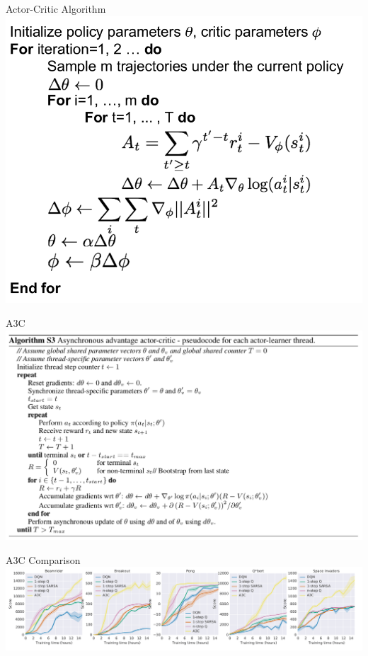 \documentclass{beamer}
\begin{document}
	\begin{frame}{Actor-Critic Algorithm }
		\centering
		\includegraphics[height=0.8\textheight]{vanillaActorCritic.png}
	\end{frame}
	
	\begin{frame}{A3C}
		\centering
		\includegraphics[height=0.8\textheight]{a3c.png}
	\end{frame}
	
	\begin{frame}{A3C Comparison}
		\centering
		\includegraphics[width=\textwidth]{a3cScores.png}
	\end{frame}
	
\end{document}

